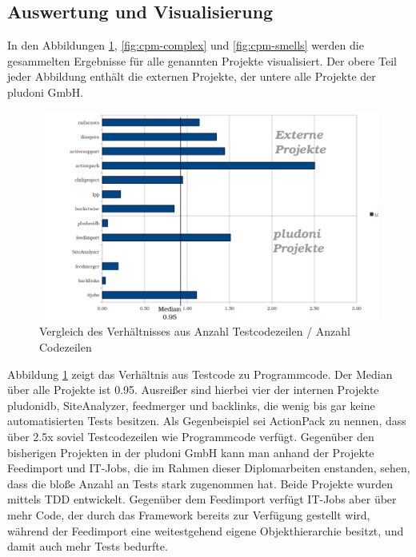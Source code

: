 \subsection{Auswertung und Visualisierung}
In den Abbildungen \ref{fig:cpm-loclot}, \ref{fig:cpm-complex} und \ref{fig:cpm-smells} werden die gesammelten Ergebnisse für alle genannten Projekte visualisiert. Der obere Teil jeder Abbildung enthält die externen Projekte, der untere alle Projekte der pludoni GmbH.
\begin{figure}[htbp]
 \centering
 \includegraphics[width=\linewidth]{./diagrams/cpm-lotloc.pdf}
 \caption{Vergleich des Verhältnisses aus Anzahl Testcodezeilen / Anzahl Codezeilen}
 \label{fig:cpm-loclot}
\end{figure}

Abbildung \ref{fig:cpm-loclot} zeigt das Verhältnis aus Testcode zu Programmcode. Der Median über alle Projekte ist 0.95. Ausreißer sind hierbei vier der internen Projekte pludonidb, SiteAnalyzer, feedmerger und backlinks, die wenig bis gar keine automatisierten  Tests besitzen. Als Gegenbeispiel sei ActionPack zu nennen, dass über 2.5x soviel Testcodezeilen wie Programmcode verfügt. Gegenüber den bisherigen Projekten in der pludoni GmbH kann man anhand der Projekte Feedimport und IT-Jobs, die im Rahmen dieser Diplomarbeiten enstanden, sehen, dass die bloße Anzahl an Tests stark zugenommen hat. Beide Projekte wurden mittels TDD entwickelt. Gegenüber dem Feedimport verfügt IT-Jobs aber über mehr Code, der durch das Framework bereits zur Verfügung gestellt wird, während der Feedimport eine weitestgehend eigene Objekthierarchie besitzt, und damit auch mehr Tests bedurfte.

